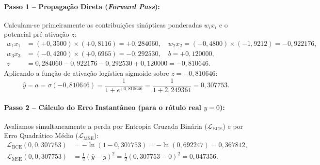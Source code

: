 ﻿\documentclass[runningheads]{llncs}
\begin{document}
\paragraph{Passo 1 -- Propaga\c{c}\~{a}o Direta (\textit{Forward Pass}):}
Calculam-se primeiramente as contribui\c{c}\~{o}es sin\'{a}pticas ponderadas $w_i x_i$ e o potencial pr\'{e}-ativa\c{c}\~{a}o $z$:
\begin{align}
    w_1 x_1 &= (+0{,}3500) \times (+0{,}8116) = +0{,}284060, \quad w_2 x_2 = (+0{,}4800) \times (-1{,}9212) = -0{,}922176, \nonumber\\
    w_3 x_3 &= (-0{,}4200) \times (+0{,}6965) = -0{,}292530, \quad b = +0{,}120000, \nonumber\\
    z &= 0{,}284060 - 0{,}922176 - 0{,}292530 + 0{,}120000 = -0{,}810646.
\end{align}
Aplicando a fun\c{c}\~{a}o de ativa\c{c}\~{a}o log\'{i}stica sigmoide sobre $z = -0{,}810646$:
\begin{equation}
    \hat{y} = a = \sigma(-0{,}810646) = \frac{1}{1 + e^{+0{,}810646}} = \frac{1}{1 + 2{,}249361} = 0{,}307753.
\end{equation}

\paragraph{Passo 2 -- C\'{a}lculo do Erro Instant\^{a}neo (para o r\'{o}tulo real $y = 0$):}
Avaliamos simultaneamente a perda por Entropia Cruzada Bin\'{a}ria ($\mathcal{L}_{\text{BCE}}$) e por Erro Quadr\'{a}tico M\'{e}dio ($\mathcal{L}_{\text{MSE}}$):
\begin{align}
    \mathcal{L}_{\text{BCE}}(0, 0{,}307753) &= -\ln(1 - 0{,}307753) = -\ln(0{,}692247) = 0{,}367812, \\
    \mathcal{L}_{\text{MSE}}(0, 0{,}307753) &= \frac{1}{2}(\hat{y} - y)^2 = \frac{1}{2}(0{,}307753 - 0)^2 = 0{,}047356.
\end{align}
\end{document}
